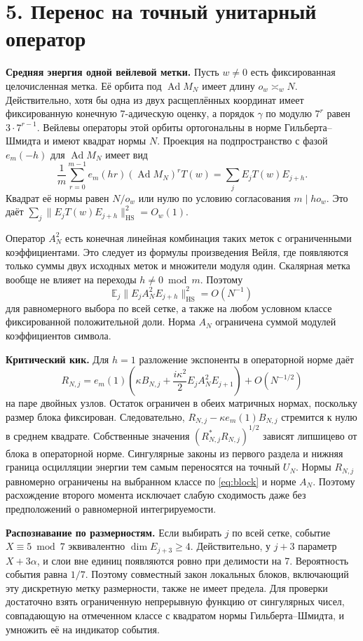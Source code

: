 \documentclass[11pt,a4paper]{article}
\newcommand{\EE}{\mathbb E}
\newcommand{\sect}[1]{\section*{\sffamily\color{ink}#1}}
\newcommand{\subt}[1]{\par\medskip\noindent\textbf{#1.}\quad}
\newcommand{\Ad}{\operatorname{Ad}}
\newcommand{\HS}{\mathrm{HS}}
\begin{document}
\newpage
\sect{5. Перенос на точный унитарный оператор}
\subt{Средняя энергия одной вейлевой метки}
Пусть \(w\ne0\) есть фиксированная целочисленная метка. Её орбита под \(\Ad M_N\) имеет длину \(o_w\asymp_w N\). Действительно, хотя бы одна из двух расщеплённых координат имеет фиксированную конечную \(7\)-адическую оценку, а порядок \(\gamma\) по модулю \(7^r\) равен \(3\cdot7^{r-1}\). Вейлевы операторы этой орбиты ортогональны в норме Гильберта--Шмидта и имеют квадрат нормы \(N\). Проекция на подпространство с фазой \(e_m(-h)\) для \(\Ad M_N\) имеет вид
\[
  \frac1m\sum_{r=0}^{m-1}e_m(hr)(\Ad M_N)^rT(w)
                 =\sum_j E_jT(w)E_{j+h}.
\]
Квадрат её нормы равен \(N/o_w\) или нулю по условию согласования \(m\mid h o_w\). Это даёт \(\sum_j\|E_jT(w)E_{j+h}\|^2_{\HS}=O_w(1)\).

Оператор \(A_N^2\) есть конечная линейная комбинация таких меток с ограниченными коэффициентами. Это следует из формулы произведения Вейля, где появляются только суммы двух исходных меток и множители модуля один. Скалярная метка вообще не влияет на переходы \(h\ne0\bmod m\). Поэтому
\[
 \EE_j\|E_jA_N^2E_{j+h}\|_{\HS}^2=O(N^{-1})
\]
для равномерного выбора по всей сетке, а также на любом условном классе фиксированной положительной доли. Норма \(A_N\) ограничена суммой модулей коэффициентов символа.

\subt{Критический кик}
Для \(h=1\) разложение экспоненты в операторной норме даёт
\[
 R_{N,j}=
  e_m(1)\left(\kappa B_{N,j}
              +\frac{i\kappa^2}{2} E_jA_N^2E_{j+1}\right)+O(N^{-1/2})
\]
на паре двойных узлов. Остаток ограничен в обеих матричных нормах, поскольку размер блока фиксирован. Следовательно, \(R_{N,j}-\kappa e_m(1)B_{N,j}\) стремится к нулю в среднем квадрате. Собственные значения \((R_{N,j}^*R_{N,j})^{1/2}\) зависят липшицево от блока в операторной норме. Сингулярные законы из первого раздела и нижняя граница осцилляции энергии тем самым переносятся на точный \(U_N\). Нормы \(R_{N,j}\) равномерно ограничены на выбранном классе по \eqref{eq:block} и норме \(A_N\). Поэтому расхождение второго момента исключает слабую сходимость даже без предположений о равномерной интегрируемости.

\subt{Распознавание по размерностям}
Если выбирать \(j\) по всей сетке, событие \(X\equiv5\bmod7\) эквивалентно \(\dim E_{j+3}\ge4\). Действительно, у \(j+3\) параметр \(X+3\alpha\), и слои вне единиц появляются ровно при делимости на 7. Вероятность события равна \(1/7\). Поэтому совместный закон локальных блоков, включающий эту дискретную метку размерности, также не имеет предела. Для проверки достаточно взять ограниченную непрерывную функцию от сингулярных чисел, совпадающую на отмеченном классе с квадратом нормы Гильберта--Шмидта, и умножить её на индикатор события.
\end{document}
